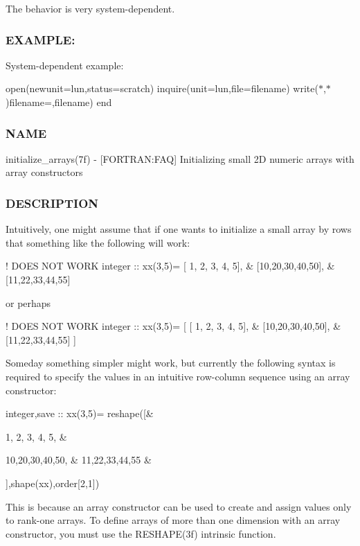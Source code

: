 The behavior is very system-\/dependent.

\subsubsection*{E\+X\+A\+M\+P\+LE\+:}

System-\/dependent example\+:

open(newunit=lun,status=\textquotesingle{}scratch\textquotesingle{}) inquire(unit=lun,file=filename) write($\ast$,$\ast$)\textquotesingle{}filename=\textquotesingle{},filename) end \subsubsection*{N\+A\+ME}

initialize\+\_\+arrays(7f) -\/ \mbox{[}F\+O\+R\+T\+R\+AN\+:F\+AQ\mbox{]} Initializing small 2D numeric arrays with array constructors \subsubsection*{D\+E\+S\+C\+R\+I\+P\+T\+I\+ON}

Intuitively, one might assume that if one wants to initialize a small array by rows that something like the following will work\+:

! D\+O\+ES N\+OT W\+O\+RK integer \+:\+: xx(3,5)= \mbox{[} 1, 2, 3, 4, 5\mbox{]}, \& \mbox{[}10,20,30,40,50\mbox{]}, \& \mbox{[}11,22,33,44,55\mbox{]}

or perhaps

! D\+O\+ES N\+OT W\+O\+RK integer \+:\+: xx(3,5)= \mbox{[} \mbox{[} 1, 2, 3, 4, 5\mbox{]}, \& \mbox{[}10,20,30,40,50\mbox{]}, \& \mbox{[}11,22,33,44,55\mbox{]} \mbox{]}

Someday something simpler might work, but currently the following syntax is required to specify the values in an intuitive row-\/column sequence using an array constructor\+:

integer,save \+:\+: xx(3,5)= reshape(\mbox{[}\& \begin{DoxyVerb}1, 2, 3, 4, 5, &
\end{DoxyVerb}
 10,20,30,40,50, \& 11,22,33,44,55 \&

\mbox{]},shape(xx),order\mbox{[}2,1\mbox{]})

This is because an array constructor can be used to create and assign values only to rank-\/one arrays. To define arrays of more than one dimension with an array constructor, you must use the R\+E\+S\+H\+A\+P\+E(3f) intrinsic function.

